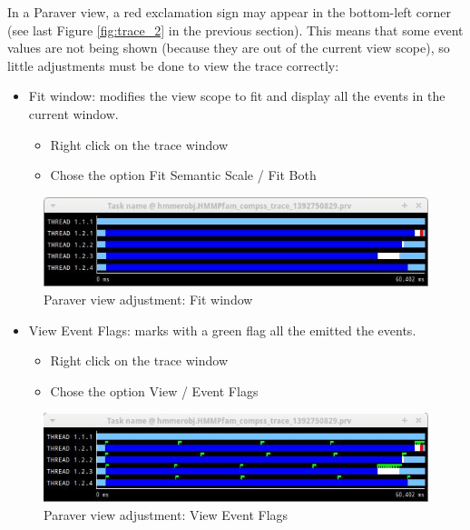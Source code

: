 In a Paraver view, a red exclamation sign may appear in the bottom-left corner (see last Figure \ref{fig:trace_2} in the previous section). This means that some event values are not being shown (because they are out of the current view scope), so little adjustments must be done to
view the trace correctly:

\begin{itemize}
 \item Fit window: modifies the view scope to fit and display all the events in the current window.
	\begin{itemize}
	    \item Right click on the trace window
	    \item Chose the option Fit Semantic Scale / Fit Both
	\end{itemize}
\end{itemize}

\begin{figure}[ht!]
  \centering
    \includegraphics[width=1.0\textwidth]{./Sections/3_Visualization/Figures/3.jpeg}
    \caption{Paraver view adjustment: Fit window}
\end{figure}

\begin{itemize} 
 \item View Event Flags: marks with a green flag all the emitted the events.
	\begin{itemize}
	    \item Right click on the trace window
	    \item Chose the option View / Event Flags
	\end{itemize}
\end{itemize}
 
\begin{figure}[ht!]
  \centering
    \includegraphics[width=1.0\textwidth]{./Sections/3_Visualization/Figures/4.jpeg}
    \caption{Paraver view adjustment: View Event Flags}
\end{figure}

